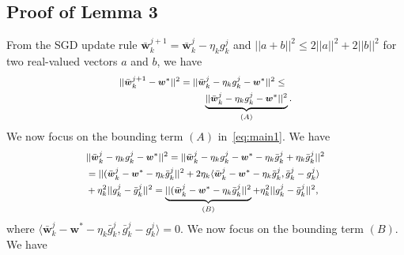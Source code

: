 \vspace{-15pt} 
\subsection{Proof of Lemma 3}
\label{Lemma_lemma3:SGDupdate}
From the SGD update rule $\bar{\boldsymbol{w}}_k^{j+1}  = \bar{\boldsymbol{w}}_k^j - \eta_kg_k^j $ and $||a+b||^2 \leq 2||a||^2 +2||b||^2$ for two real-valued vectors $a$ and $b$, we have %
\begin{equation}\label{eq:main1}
\footnotesize 
\begin{aligned} 
 &||\bar{\boldsymbol{w}}_k^{j+1} - \boldsymbol{w}^*||^2 = ||\bar{\boldsymbol{w}}_k^j - \eta_kg_k^j  - \boldsymbol{w}^*||^2  \leq \\ 
 &\quad \quad \quad \quad \quad \quad \quad \quad \quad \underbrace{||\bar{\boldsymbol{w}}_k^j - \eta_kg_k^j  - \boldsymbol{w}^*||^2}_{(A)}. 
\end{aligned}
\end{equation}
We now focus on the bounding term $(A)$ in~\eqref{eq:main1}. We have
\begin{equation} \label{equa:termA}
\footnotesize
\begin{aligned}
&||\bar{\boldsymbol{w}}_k^j - \eta_kg_k^j  - \boldsymbol{w}^*||^2 = ||\bar{\boldsymbol{w}}_k^j - \eta_kg_k^j - \boldsymbol{w}^* -\eta_k\bar{g}_k^j +\eta_k\bar{g}_k^j||^2 
\\&=||(\bar{\boldsymbol{w}}_k^j - \boldsymbol{w}^* -\eta_k\bar{g}_k^j||^2 + 2\eta_k\langle \bar{\boldsymbol{w}}_k^j - \boldsymbol{w}^* -\eta_k\bar{g}_k^j,\bar{g}_k^j -g_k^j\rangle 
\\& + \eta_k^2||g_k^j - \bar{g}_k^j||^2  
=\underbrace{||(\bar{\boldsymbol{w}}_k^j - \boldsymbol{w}^* -\eta_k\bar{g}_k^j||^2}_{(B)}  + \eta_k^2||g_k^j - \bar{g}_k^j||^2,
\end{aligned}
\end{equation}
where $\langle \bar{\boldsymbol{w}}_k^j - \boldsymbol{w}^* -\eta_k\bar{g}_k^j,\bar{g}_k^j -g_k^j\rangle =0$. We now focus on the bounding term $(B)$. We have \vspace{-5pt}

